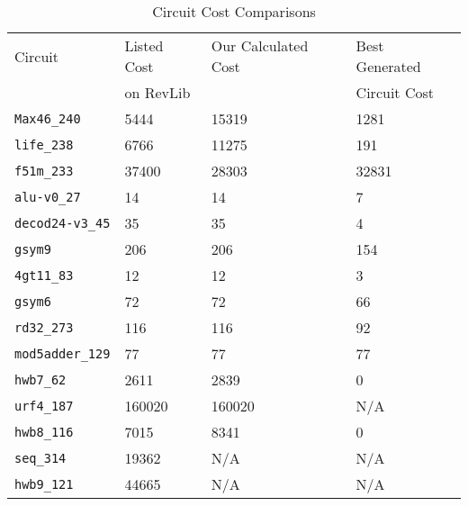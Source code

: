 \begin{table}[H]
\begin{center}
    \begin{tabular}{l | l | l | l}
       Circuit            & Listed Cost & Our Calculated Cost & Best Generated  \\ 
                          & on RevLib   &                     & Circuit Cost    \\ \hline
     \verb!Max46_240!     & 5444                  & 15319               & 1281                        \\
     \verb!life_238!      & 6766                  & 11275               & 191                         \\
     \verb!f51m_233!      & 37400                 & 28303               & 32831                       \\
     \verb!alu-v0_27!     & 14                    & 14                  & 7                           \\
     \verb!decod24-v3_45! & 35                    & 35                  & 4                           \\
     \verb!gsym9!         & 206                   & 206                 & 154                         \\
     \verb!4gt11_83!      & 12                    & 12                  & 3                           \\
     \verb!gsym6!         & 72                    & 72                  & 66                          \\
     \verb!rd32_273!      & 116                   & 116                 & 92                          \\
     \verb!mod5adder_129! & 77                    & 77                  & 77                          \\
     \verb!hwb7_62!       & 2611                  & 2839                & 0                           \\
     \verb!urf4_187!      & 160020                & 160020              & N/A                          \\
     \verb!hwb8_116!      & 7015                  & 8341                & 0                           \\
     \verb!seq_314!       & 19362                 & N/A                  & N/A                          \\
     \verb!hwb9_121!      & 44665                 & N/A                  & N/A                          \\
    \end{tabular}
 \caption {Circuit Cost Comparisons}
\label{tab:CCC}
\end{center}
\end{table}